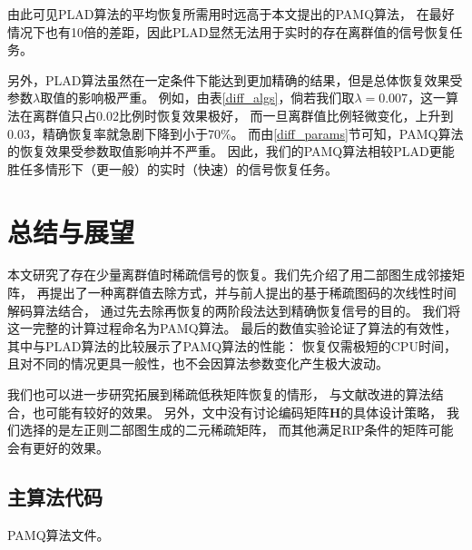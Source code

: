 \documentclass[AutoFakeBold]{LZUThesis}
\begin{document}
由此可见PLAD算法的平均恢复所需用时远高于本文提出的PAMQ算法，
在最好情况下也有10倍的差距，因此PLAD显然无法用于实时的存在离群值的信号恢复任务。

另外，PLAD算法虽然在一定条件下能达到更加精确的结果，但是总体恢复效果受参数$\lambda$取值的影响极严重。
例如，由表\ref{diff_algs}，倘若我们取$\lambda=0.007$，这一算法在离群值只占0.02比例时恢复效果极好，
而一旦离群值比例轻微变化，上升到0.03，精确恢复率就急剧下降到小于70\%。
而由\ref{diff_params}节可知，PAMQ算法的恢复效果受参数取值影响并不严重。
因此，我们的PAMQ算法相较PLAD更能胜任多情形下（更一般）的实时（快速）的信号恢复任务。

\chapter{总结与展望}
\label{5}

本文研究了存在少量离群值时稀疏信号的恢复。我们先介绍了用二部图生成邻接矩阵，
再提出了一种离群值去除方式，并与前人提出的基于稀疏图码的次线性时间解码算法结合，
通过先去除再恢复的两阶段法达到精确恢复信号的目的。
我们将这一完整的计算过程命名为PAMQ算法。
最后的数值实验论证了算法的有效性，
其中与PLAD算法的比较展示了PAMQ算法的性能：
恢复仅需极短的CPU时间，
且对不同的情况更具一般性，也不会因算法参数变化产生极大波动。

我们也可以进一步研究拓展到稀疏低秩矩阵恢复的情形，
与文献\cite{10120641}改进的算法结合，也可能有较好的效果。
另外，文中没有讨论编码矩阵$\mathbf{H}$的具体设计策略，
我们选择的是左正则二部图生成的二元稀疏矩阵，
而其他满足RIP条件的矩阵可能会有更好的效果。


% 


\backmatter


\printbib



\Appendix

\section{主算法代码}

PAMQ算法文件。
\end{document}
